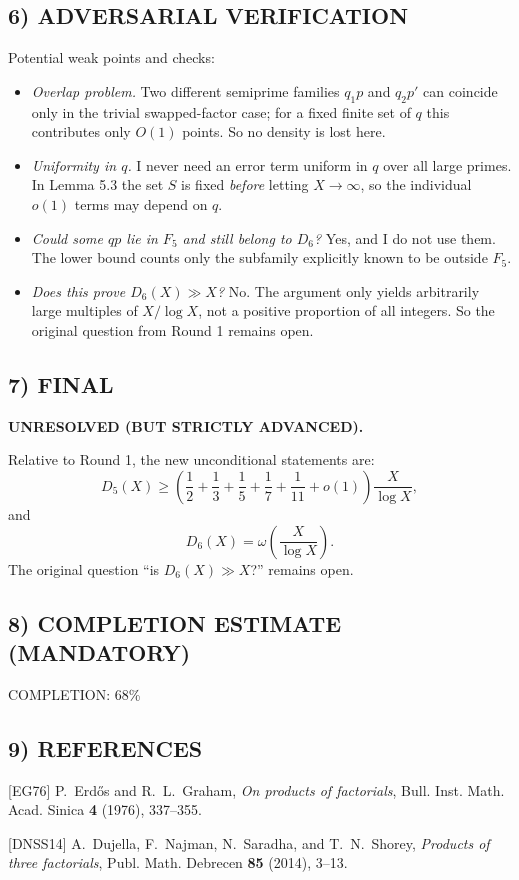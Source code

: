 \subsection*{6) ADVERSARIAL VERIFICATION}
Potential weak points and checks:
\begin{itemize}
\item \emph{Overlap problem.}  
Two different semiprime families $q_1p$ and $q_2p'$ can coincide only in the trivial swapped-factor case; for a fixed finite set of $q$ this contributes only $O(1)$ points.  So no density is lost here.

\item \emph{Uniformity in $q$.}  
I never need an error term uniform in $q$ over all large primes.  In Lemma 5.3 the set $S$ is fixed \emph{before} letting $X\to\infty$, so the individual $o(1)$ terms may depend on $q$.

\item \emph{Could some $qp$ lie in $F_5$ and still belong to $D_6$?}  
Yes, and I do not use them.  The lower bound counts only the subfamily explicitly known to be outside $F_5$.

\item \emph{Does this prove $D_6(X)\gg X$?}  
No.  The argument only yields arbitrarily large multiples of $X/\log X$, not a positive proportion of all integers.  So the original question from Round 1 remains open.
\end{itemize}

\subsection*{7) FINAL}
\textbf{UNRESOLVED (BUT STRICTLY ADVANCED).}

Relative to Round 1, the new unconditional statements are:
\[
D_5(X)\ge \left(\frac12+\frac13+\frac15+\frac17+\frac1{11}+o(1)\right)\frac{X}{\log X},
\]
and
\[
D_6(X)=\omega\!\left(\frac{X}{\log X}\right).
\]
The original question ``is $D_6(X)\gg X$?'' remains open.

\subsection*{8) COMPLETION ESTIMATE (MANDATORY)}
COMPLETION: 68\%

\subsection*{9) REFERENCES}
[EG76] P.~Erd\H{o}s and R.~L.~Graham, \emph{On products of factorials}, Bull. Inst. Math. Acad. Sinica \textbf{4} (1976), 337--355.

[DNSS14] A.~Dujella, F.~Najman, N.~Saradha, and T.~N.~Shorey, \emph{Products of three factorials}, Publ. Math. Debrecen \textbf{85} (2014), 3--13.

\bigskip

